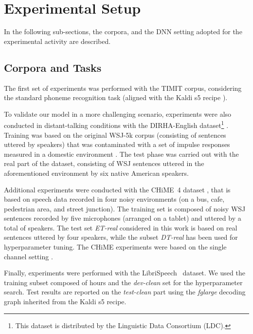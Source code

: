 \documentclass{article}
\begin{document}
\section{Experimental Setup} \label{sec:setup}
In the following sub-sections, the corpora, and the DNN setting adopted for the experimental activity are described.

\subsection{Corpora and Tasks}
The first set of experiments was performed with the TIMIT corpus, considering the standard phoneme recognition task (aligned with the Kaldi s5 recipe \cite{kaldi_short}). 

To validate our model in a more challenging scenario, experiments were also conducted in distant-talking conditions with the DIRHA-English dataset\footnote{This dataset is distributed by the Linguistic Data Consortium (LDC).} \cite{dirha_asru,rav_is16}. Training was based on the original WSJ-5k corpus (consisting of  sentences uttered by  speakers) that was contaminated with a set of impulse responses measured in a domestic environment \cite{rav_is16}.
The test phase was carried out with the real part of the dataset, consisting of  WSJ sentences uttered in the aforementioned environment by six native American speakers. 

Additional experiments were conducted with the CHiME~4 dataset \cite{chime3}, that is based on speech data recorded in four noisy environments (on a bus, cafe, pedestrian area, and street junction). The training set is composed of  noisy WSJ sentences recorded by five microphones (arranged on a tablet) and uttered by a total of  speakers. 
The test set \textit{ET-real} considered in this work is based on  real sentences uttered by four speakers, while the subset \textit{DT-real} has been used for hyperparameter tuning. The CHiME experiments were based on the single channel setting \cite{chime3}. 

Finally, experiments were performed with the LibriSpeech~\cite{librispeech} dataset. 
We used the training subset composed of  hours and the \textit{dev-clean} set for the hyperparameter search. Test results are reported on the \textit{test-clean} part using the \textit{fglarge} decoding graph inherited from the Kaldi s5 recipe. 
\end{document}
